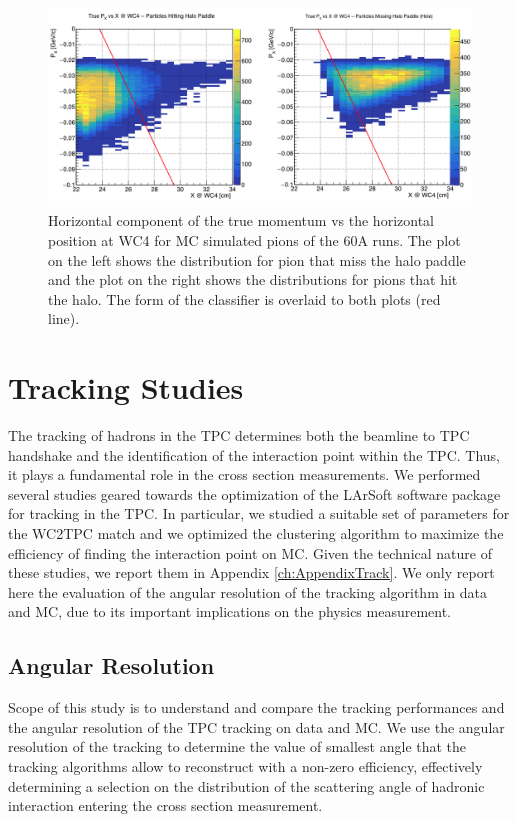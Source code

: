 \begin{figure}[hbpt]
\centering
\includegraphics[width=\textwidth]{Chapter-5/Images/PXVsX60A.png}
\caption{Horizontal component of the true momentum vs the horizontal position at WC4 for MC simulated pions of the 60A runs. The plot on the left shows the distribution for pion that miss the halo paddle and the plot on the right shows the distributions for pions that hit the halo. The form of the classifier is overlaid to both plots (red line).}
\label{fig:PxVsXTrue}
\end{figure}

\section{Tracking Studies}\label{sec:TrackingStudies}
The tracking of hadrons in the TPC determines both the beamline to TPC handshake and the identification of the interaction point within the TPC. Thus, it plays a fundamental role in the cross section measurements. We performed several studies geared towards the optimization of the LArSoft software package for tracking in the TPC. In particular, we studied a suitable set of parameters for the WC2TPC match and we optimized the clustering algorithm to maximize the efficiency of finding the interaction point on MC. Given the technical nature of these studies, we report them in Appendix \ref{ch:AppendixTrack}. 
We only report here the evaluation of  the angular resolution of the tracking algorithm in data and MC, due to its important implications on the physics measurement.


\subsection{Angular Resolution}\label{sec:angleRes}
Scope of this study is to understand and compare the tracking performances and the angular resolution of the TPC tracking on data and MC. 
We use the angular resolution of the tracking to determine  the value of smallest angle that the tracking algorithms allow to reconstruct with a non-zero efficiency, effectively determining a selection on the distribution of the scattering angle of hadronic interaction entering the cross section measurement. %

